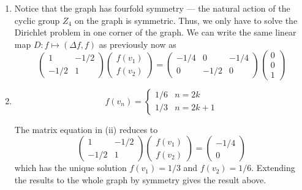 \documentclass[12 pt, letterpaper]{hmcpset}
\begin{document}
\begin{landscape}
\begin{solution}
\begin{enumerate}
\begin{align*}
\begin{pmatrix}
   0 &    0 & 0 &    0 &    0 &    0 & 0 &    0 &    0 & -\frac{1}{4} & 0 & -\frac{1}{4} &    0 &    0 & 0 &    0 &    0 \\
   0 &    0 & 0 &    0 &    0 &    0 & 0 &    0 &    0 &    0 & 0 &    0 & -\frac{1}{4} &    0 & 0 &    0 & -\frac{1}{4} \\
   0 &    0 & 0 &    0 &    0 &    0 & 0 &    0 &    0 &    0 & 0 &    0 &    0 & -\frac{1}{4} & 0 & -\frac{1}{4} &    0 \\
\end{pmatrix} \begin{pmatrix}
	0 \\
	\vdots \\
	0 \\
	1
\end{pmatrix}
			\end{align*}
		\item Notice that the graph has fourfold symmetry --- the natural action of the cyclic group $Z_{4}$ on the graph is symmetric. Thus, we only have to solve the Dirichlet problem in one corner of the graph. We can write the same linear map $D : f \mapsto (\Delta f, f)$ as previously now as
			\[
				\begin{pmatrix}
					1 & -1/2 \\
					-1/2 & 1
				\end{pmatrix} \begin{pmatrix}
					f(v_{1}) \\
					f(v_{2})
				\end{pmatrix} = \begin{pmatrix}
					-1/4 & 0 & -1/4 \\
					0 & -1/2 & 0
				\end{pmatrix} \begin{pmatrix}
					0 \\
					0 \\
					1
				\end{pmatrix}
			\]
		\item 
			\[
				\boxed{
					f(v_{n}) = \begin{cases}
						1/6 & n = 2k \\
						1/3 & n = 2k + 1
					\end{cases}
				}
			\]

			The matrix equation in (ii) reduces to
			\[
				\begin{pmatrix}
					1 & -1/2 \\
					-1/2 & 1
				\end{pmatrix} \begin{pmatrix}
					f(v_{1}) \\
					f(v_{2})
				\end{pmatrix} = \begin{pmatrix}
					-1/4 \\
					0
				\end{pmatrix}
			\]
			which has the unique solution $f(v_{1}) = 1/3$ and $f(v_{2}) = 1/6$. Extending the results to the whole graph by symmetry gives the result above.
\end{enumerate}
\end{solution}	
\end{landscape}
\end{document}
